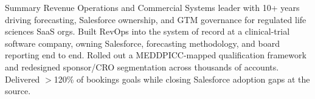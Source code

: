 \documentclass{resume}
\begin{document}
\vspace{-0.15cm}

\begin{rSection}{Summary}
Revenue Operations and Commercial Systems leader with 10+ years driving forecasting, Salesforce ownership, and GTM governance for regulated life sciences SaaS orgs. Built RevOps into the system of record at a clinical-trial software company, owning Salesforce, forecasting methodology, and board reporting end to end. Rolled out a MEDDPICC-mapped qualification framework and redesigned sponsor/CRO segmentation across thousands of accounts. Delivered $>$120\% of bookings goals while closing Salesforce adoption gaps at the source.
\end{rSection}
\vspace{-0.15cm}
\end{document}

